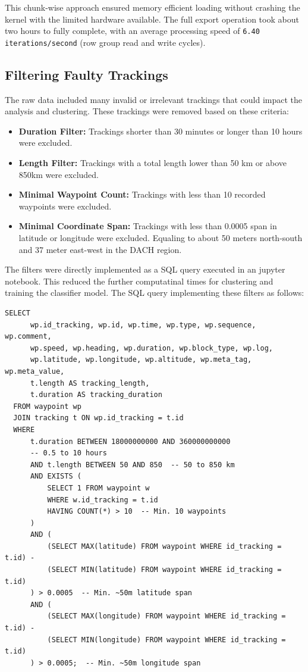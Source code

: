 \documentclass[a4paper,12pt,twoside]{scrreprt}
\begin{document}
This chunk-wise approach ensured memory efficient loading without crashing the
kernel with the limited hardware available.
The full export operation took about two hours to fully complete, with an
average processing speed of \texttt{6.40 iterations/second} (row group read and
write cycles).

\subsection{Filtering Faulty Trackings}
The raw data included many invalid or irrelevant trackings that could impact
the analysis and clustering. These trackings were removed based on these
criteria:

\begin{itemize}
  \item \textbf{Duration Filter:} Trackings shorter than 30 minutes or longer
        than 10 hours were excluded.
  \item \textbf{Length Filter:} Trackings with a total length lower than 50 km
        or above 850km were excluded.
  \item \textbf{Minimal Waypoint Count:} Trackings with less than 10 recorded
        waypoints were excluded.
  \item \textbf{Minimal Coordinate Span:} Trackings with less than 0.0005 span
        in latitude or longitude were excluded. Equaling to about 50 meters
        north-south
        and 37 meter east-west in the DACH region.
\end{itemize}

The filters were directly implemented as a SQL query executed in an jupyter
notebook. This reduced the further computatinal times for clustering and
training the classifier model. The SQL query implementing these filters
as follows:
\begin{lstlisting}[style=sql,caption={SQL query used for filtering the GPS tracking dataset},label={lst:sql-filter}]
  SELECT 
      wp.id_tracking, wp.id, wp.time, wp.type, wp.sequence, wp.comment, 
      wp.speed, wp.heading, wp.duration, wp.block_type, wp.log, 
      wp.latitude, wp.longitude, wp.altitude, wp.meta_tag, wp.meta_value,
      t.length AS tracking_length, 
      t.duration AS tracking_duration
  FROM waypoint wp
  JOIN tracking t ON wp.id_tracking = t.id
  WHERE 
      t.duration BETWEEN 18000000000 AND 360000000000  
      -- 0.5 to 10 hours
      AND t.length BETWEEN 50 AND 850  -- 50 to 850 km
      AND EXISTS (
          SELECT 1 FROM waypoint w 
          WHERE w.id_tracking = t.id
          HAVING COUNT(*) > 10  -- Min. 10 waypoints
      )
      AND (
          (SELECT MAX(latitude) FROM waypoint WHERE id_tracking = t.id) - 
          (SELECT MIN(latitude) FROM waypoint WHERE id_tracking = t.id)
      ) > 0.0005  -- Min. ~50m latitude span
      AND (
          (SELECT MAX(longitude) FROM waypoint WHERE id_tracking = t.id) - 
          (SELECT MIN(longitude) FROM waypoint WHERE id_tracking = t.id)
      ) > 0.0005;  -- Min. ~50m longitude span
  \end{lstlisting}
\end{document}
